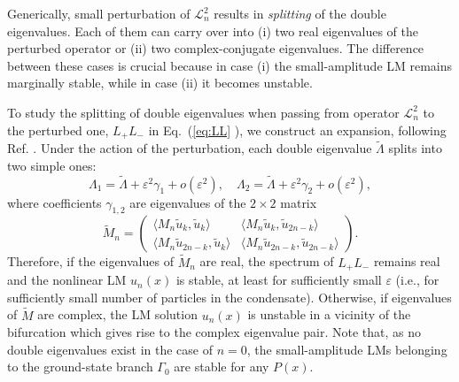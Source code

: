 \documentclass[aps,preprint,showkeys,
]{revtex4}
\begin{document}
Generically, small perturbation of $\mathcal{L}_{n}^{2}$ results in \textit{%
splitting} of the double eigenvalues. Each of them can carry over into (i)
two real eigenvalues of the perturbed operator or (ii) two complex-conjugate
eigenvalues. The difference between these cases is crucial because in case
(i) the small-amplitude LM remains marginally stable, while in case (ii) it
becomes unstable.

To study the splitting of double eigenvalues when passing from operator $%
\mathcal{L}_{n}^{2}$ to the perturbed one, $L_{+}L_{-}$ in Eq.~(\ref{eq:LL}%
), %
we construct an expansion, following Ref. \cite{ZAKP08}. Under the action of
the perturbation, each double eigenvalue $\tilde{\Lambda}$ splits into two
simple ones:
\begin{equation}
\Lambda _{1}=\tilde{\Lambda}+\varepsilon ^{2}\gamma _{1}+o(\varepsilon
^{2}),\quad \Lambda _{2}=\tilde{\Lambda}+\varepsilon ^{2}\gamma
_{2}+o(\varepsilon ^{2}),
\end{equation}%
where coefficients $\gamma _{1,2}$ are eigenvalues of the $2\times 2$ matrix
\begin{equation}
\tilde{M}_{n}=\left(
\begin{array}{cc}
\langle M_{n}\tilde{u}_{k},\tilde{u}_{k}\rangle & \langle M_{n}\tilde{u}_{k},%
\tilde{u}_{2n-k}\rangle \\[2mm]
\langle M_{n}\tilde{u}_{2n-k},\tilde{u}_{k}\rangle & \langle M_{n}\tilde{u}%
_{2n-k},\tilde{u}_{2n-k}\rangle%
\end{array}%
\right) .  \label{Lambda_12_as}
\end{equation}%
Therefore, if the eigenvalues of $\tilde{M}_{n}$ are real, the spectrum of $%
L_{+}L_{-}$ remains real and the nonlinear LM $u_{n}(x)$ is stable, at least
for sufficiently small $\varepsilon $ (i.e., for sufficiently small number
of particles in the condensate). Otherwise, if eigenvalues of $\tilde{M}$
are complex, the LM solution $u_{n}(x)$ is unstable in a vicinity of the
bifurcation which gives rise to the complex eigenvalue pair. Note that, as
no double eigenvalues exist in the case of $n=0$, the small-amplitude LMs
belonging to the ground-state branch $\Gamma _{0}$ are stable for any $P(x)$.
\end{document}
